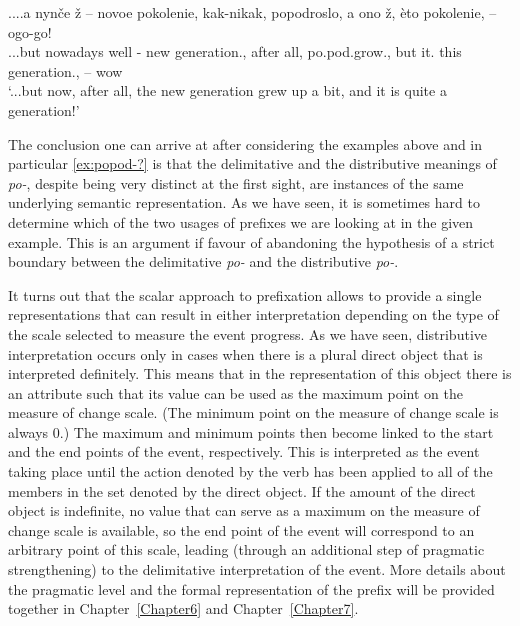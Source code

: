 \exg.\label{ex:popod-?}...a nyn\v{c}e \v{z} – novoe pokolenie, kak-nikak, popodroslo, a ono \v{z}, \`{e}to pokolenie, -- ogo-go!\\
...but nowadays well - new generation., {after all}, po.pod.grow., but it. {} this generation., -- wow
\\
\trans `...but now, after all, the new generation grew up a bit, and it is quite a generation!'
 
The conclusion one can arrive at after considering the examples above and in particular \ref{ex:popod-?} is that the delimitative and the distributive meanings of \textit{po-}, despite being very distinct at the first sight, are instances of the same underlying semantic representation. As we have seen, it is sometimes hard to determine which of the two usages of prefixes we are looking at in the given example. This is an argument if favour of abandoning the hypothesis of a strict boundary between the delimitative \textit{po-} and the distributive \textit{po-}.

It turns out that the scalar approach to prefixation allows to provide a single representations that can result in either interpretation depending on the type of the scale selected to measure the event progress. As we have seen, distributive interpretation occurs only in cases when there is a plural direct object that is interpreted definitely. This means that in the representation of this object there is an attribute such that its value can be used as the maximum point on the measure of change scale. (The minimum point on the measure of change scale is always 0.) The maximum and minimum points then become linked to the start and the end points of the event, respectively. This is interpreted as the event taking place until the action denoted by the verb has been applied to all of the members in the set denoted by the direct object. If the amount of the direct object is indefinite, no value that can serve as a maximum on the measure of change scale is available, so the end point of the event will correspond to an arbitrary point of this scale, leading (through an additional step of pragmatic strengthening) to the delimitative interpretation of the event. More details about the pragmatic level and the formal representation of the prefix will be provided together in Chapter~\ref{Chapter6} and Chapter~\ref{Chapter7}.

